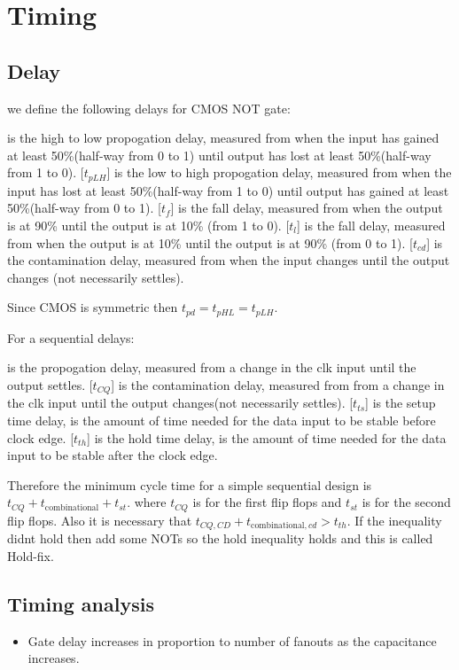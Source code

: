 \chapter{Timing}
\section{Delay}
we define the following delays for CMOS NOT gate:
\begin{definition}
    [\(t_{pHL}\)] is the high to low propogation delay, measured from when the input has gained at least 50\%(half-way from 0 to 1) until output has lost at least 50\%(half-way from 1 to 0).
        [\(t_{pLH}\)] is the low to high propogation delay, measured from when the input has lost at least 50\%(half-way from 1 to 0) until output has gained at least 50\%(half-way from 0 to 1).
        [\(t_{f}\)] is the fall delay, measured from when the output is at 90\% until the output is at 10\% (from 1 to 0).
        [\(t_{l}\)] is the fall delay, measured from when the output is at 10\% until the output is at 90\% (from 0 to 1).
        [\(t_{cd}\)] is the contamination delay, measured from when the input changes until the output changes (not necessarily settles).
\end{definition}
Since CMOS is symmetric then \(t_{pd} = t_{pHL} = t_{pLH}\).

For a sequential delays:
\begin{definition}
    [\(t_{CQ}\)] is the propogation delay, measured from a change in the clk input until the output settles.
        [\(t_{CQ}\)] is the contamination delay, measured from from a change in the clk input until the output changes(not necessarily settles).
        [\(t_{ts}\)] is the setup time delay, is the amount of time needed for the data input to be stable before clock edge.
        [\(t_{th}\)] is the hold time delay, is the amount of time needed for the data input to be stable after the clock edge.
\end{definition}
Therefore the minimum cycle time for a simple sequential design is \(t_{CQ} + t_{\text{combinational}} + t_{st}\). where \(t_{CQ}\) is for the first flip flops and \(t_{st}\) is for the second flip flops. Also it is necessary that \(t_{CQ,CD} + t_{\text{combinational},cd} > t_{th}\). If the inequality didnt hold then add some NOTs so the hold inequality holds and this is called Hold-fix.

\section{Timing analysis}
\begin{itemize}
    \item Gate delay increases in proportion to number of fanouts as the capacitance increases.
\end{itemize}

